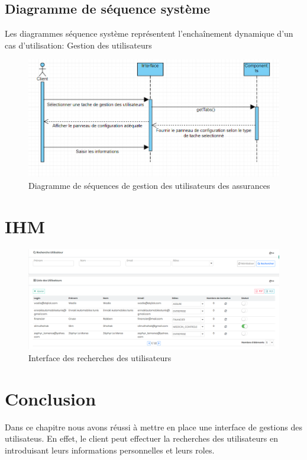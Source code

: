 \subsection{Diagramme de séquence système}
Les diagrammes séquence système représentent l’enchaînement dynamique d’un cas d’utilisation: Gestion des utilisateurs
\begin{figure}[H]
\centering
\includegraphics[width=1\columnwidth]{images/seq2.PNG}
\caption{Diagramme de séquences de gestion des utilisateurs des assurances}
\label{fig:Diagramme de cas d'utilisation sprint 1}
\end{figure}






\section{IHM}
\begin{figure}[H]
\centering
\includegraphics[width=1\columnwidth]{images/interface3.PNG}
\caption{Interface des recherches des utilisateurs}
\label{fig:Diagramme de cas d'utilisation sprint 1}
\end{figure}





\section*{Conclusion}
Dans ce chapitre nous avons réussi à mettre en place une interface de gestions des utilisateus. En effet, le client peut effectuer la recherches des utilisateurs en introduisant leurs informations personnelles et leurs roles.